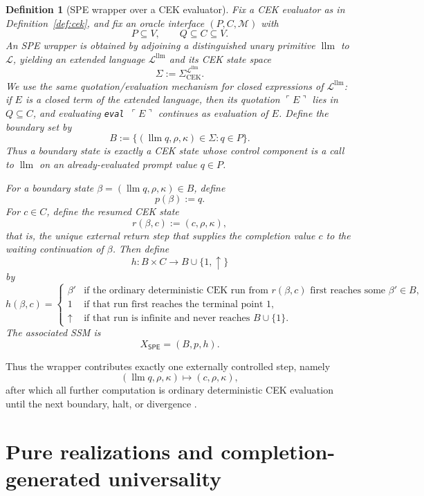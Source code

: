 \documentclass[11pt]{article}
\newtheorem{definition}{Definition}[section]
\newcommand{\SPE}{\mathsf{SPE}}
\newcommand{\llm}{\operatorname{llm}}
\begin{document}
\begin{definition}[SPE wrapper over a CEK evaluator]\label{def:spe}
Fix a CEK evaluator as in Definition~\ref{def:cek}, and fix an oracle interface $(P,C,\mathcal{M})$ with
\[
P\subseteq V,
\qquad
Q\subseteq C\subseteq V.
\]
An \emph{SPE wrapper} is obtained by adjoining a distinguished unary primitive $\llm$ to $\mathcal{L}$, yielding an extended language $\mathcal{L}^{\llm}$ and its CEK state space
\[
\Sigma:=\Sigma_{\mathrm{CEK}}^{\mathcal{L}^{\llm}}.
\]
We use the same quotation/evaluation mechanism for closed expressions of $\mathcal{L}^{\llm}$: if $E$ is a closed term of the extended language, then its quotation $\ulcorner E\urcorner$ lies in $Q\subseteq C$, and evaluating \texttt{eval} $\,\ulcorner E\urcorner$ continues as evaluation of $E$.
Define the boundary set by
\[
B:=\{(\llm q,\rho,\kappa)\in\Sigma : q\in P\}.
\]
Thus a boundary state is exactly a CEK state whose control component is a call to $\llm$ on an already-evaluated prompt value $q\in P$.

For a boundary state $\beta=(\llm q,\rho,\kappa)\in B$, define
\[
p(\beta):=q.
\]
For $c\in C$, define the resumed CEK state
\[
r(\beta,c):=(c,\rho,\kappa),
\]
that is, the unique external return step that supplies the completion value $c$ to the waiting continuation of $\beta$. Then define
\[
h:B\times C\to B\cup\{1,\uparrow\}
\]
by
\[
h(\beta,c)=
\begin{cases}
\beta' & \text{if the ordinary deterministic CEK run from } r(\beta,c) \text{ first reaches some } \beta'\in B,\\
1 & \text{if that run first reaches the terminal point } 1,\\
\uparrow & \text{if that run is infinite and never reaches } B\cup\{1\}.
\end{cases}
\]
The associated SSM is
\[
X_{\SPE}=(B,p,h).
\]
\end{definition}

Thus the wrapper contributes exactly one externally controlled step, namely
\[
(\llm q,\rho,\kappa)\longmapsto (c,\rho,\kappa),
\]
after which all further computation is ordinary deterministic CEK evaluation until the next boundary, halt, or divergence \cite{LeroyGrall09}.

\section{Pure realizations and completion-generated universality}
\end{document}
